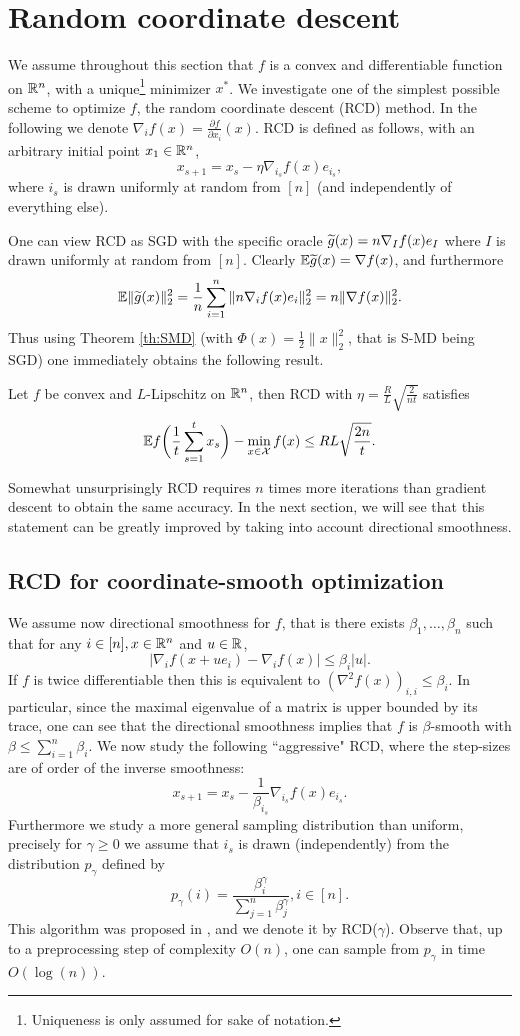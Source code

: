 \section{Random coordinate descent}
We assume throughout this section that $f$ is a convex and differentiable function on $\mathbb{R}^n$, with a unique\footnote{Uniqueness is only assumed for sake of notation.} minimizer $x^*$. We investigate one of the simplest possible scheme to optimize $f$, the random coordinate descent (RCD) method. In the following we denote $\nabla_i f(x) = \frac{\partial f}{\partial x_i} (x)$. RCD is defined as follows, with an arbitrary initial point $x_1 \in \mathbb{R}^n$,
$$x_{s+1} = x_s - \eta \nabla_{i_s} f(x) e_{i_s} ,$$
where $i_s$ is drawn uniformly at random from $[n]$ (and independently of everything else). 

One can view RCD as SGD with the specific oracle $\widetilde{g}(x) = n \nabla_{I} f(x) e_I$ where $I$ is drawn uniformly at random from $[n]$. Clearly $\mathbb{E} \widetilde{g}(x) = \nabla f(x)$, and furthermore
$$\mathbb{E} \|\widetilde{g}(x)\|_2^2 = \frac{1}{n}\sum_{i=1}^n \|n \nabla_{i} f(x) e_i\|_2^2 = n \|\nabla f(x)\|_2^2 .$$
Thus using Theorem \ref{th:SMD} (with $\Phi(x) = \frac12 \|x\|_2^2$, that is S-MD being SGD) one immediately obtains the following result. 
\begin{theorem}
Let $f$ be convex and $L$-Lipschitz on $\mathbb{R}^n$, then RCD with $\eta = \frac{R}{L} \sqrt{\frac{2}{n t}}$ satisfies
$$\mathbb{E} f\bigg(\frac{1}{t} \sum_{s=1}^t x_s \bigg) - \min_{x \in \mathcal{X}} f(x) \leq R L \sqrt{\frac{2 n}{t}} .$$
\end{theorem}
Somewhat unsurprisingly RCD requires $n$ times more iterations than gradient descent to obtain the same accuracy. In the next section, we will see that this statement can be greatly improved by taking into account directional smoothness.

\subsection{RCD for coordinate-smooth optimization}
We assume now directional smoothness for $f$, that is there exists $\beta_1, \hdots, \beta_n$ such that for any $i \in [n], x \in \mathbb{R}^n$ and $u \in \mathbb{R}$,
$$| \nabla_i f(x+u e_i) - \nabla_i f(x) | \leq \beta_i |u| .$$
If $f$ is twice differentiable then this is equivalent to $(\nabla^2 f(x))_{i,i} \leq \beta_i$. In particular, since the maximal eigenvalue of a matrix is upper bounded by its trace, one can see that the directional smoothness implies that $f$ is $\beta$-smooth with $\beta \leq \sum_{i=1}^n \beta_i$. We now study the following ``aggressive" RCD, where the step-sizes are of order of the inverse smoothness:
$$x_{s+1} = x_s - \frac{1}{\beta_{i_s}} \nabla_{i_s} f(x) e_{i_s} .$$
Furthermore we study a more general sampling distribution than uniform, precisely for $\gamma \geq 0$ we assume that $i_s$ is drawn (independently) from the distribution $p_{\gamma}$ defined by
$$p_{\gamma}(i) = \frac{\beta_i^{\gamma}}{\sum_{j=1}^n \beta_j^{\gamma}}, i \in [n] .$$
This algorithm was proposed in \cite{Nes12}, and we denote it by RCD($\gamma$). Observe that, up to a preprocessing step of complexity $O(n)$, one can sample from $p_{\gamma}$ in time $O(\log(n))$. 

